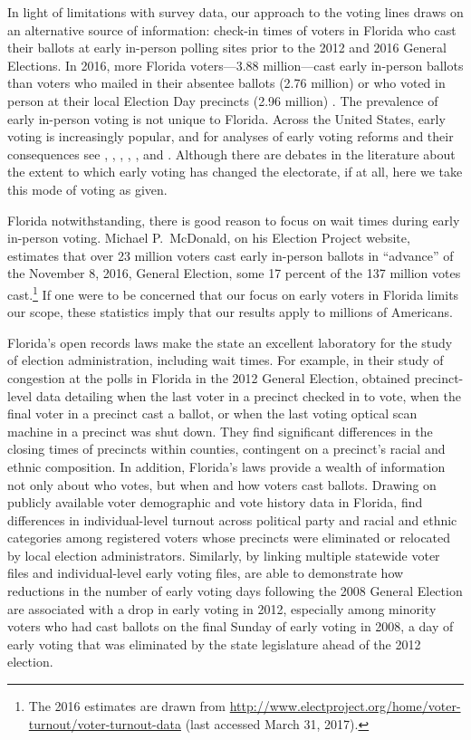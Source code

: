\documentclass[12pt,titlepage]{article}
\begin{document}
In light of limitations with survey data, our approach to the voting
lines draws on an alternative source of information: check-in times of
voters in Florida who cast their ballots at early in-person polling
sites prior to the 2012 and 2016 General Elections.  In 2016, more
Florida voters---3.88 million---cast early in-person ballots than
voters who mailed in their absentee ballots (2.76 million) or who
voted in person at their local Election Day precincts (2.96 million)
\citep{FDOS:2016vote}. The prevalence of early in-person voting is not
unique to Florida. Across the United States, early voting is
increasingly popular, and for analyses of early voting reforms and
their consequences see \citet{neelyrichardson:earlyvoting},
\citet{gronke:2012}, \citet{gronke:earlyvotingreforms},
\citet{gronketoffey:psychological}, \citet{gronkebaum:growth}, and
\citet{burdenetal:unanticipated}.  Although there are debates in the
literature about the extent to which early voting has changed the
electorate, if at all, here we take this mode of voting as
given. 

Florida notwithstanding, there is good reason to focus on wait times
during early in-person voting.  Michael P.\ McDonald, on his Election
Project website, estimates that over 23 million voters cast early
in-person ballots in ``advance'' of the November 8, 2016, General
Election, some 17 percent of the 137 million votes cast.\footnote{The
  2016 estimates are drawn from
  \url{http://www.electproject.org/home/voter-turnout/voter-turnout-data}
  (last accessed March 31, 2017).}  If one were to be concerned that
our focus on early voters in Florida limits our scope, these
statistics imply that our results apply to millions of Americans.

Florida's open records laws make the state an excellent laboratory for
the study of election administration, including wait times. For
example, in their study of congestion at the polls in Florida in the
2012 General Election, \cite{herronsmith:closingtimes} obtained
precinct-level data detailing when the last voter in a precinct
checked in to vote, when the final voter in a precinct cast a ballot,
or when the last voting optical scan machine in a precinct was shut
down. They find significant differences in the closing times of
precincts within counties, contingent on a precinct's racial and
ethnic composition.  In addition, Florida's laws provide a wealth of
information not only about who votes, but when and how voters cast
ballots.  Drawing on publicly available voter demographic and vote
history data in Florida, \cite{amos_etal2017} find differences in
individual-level turnout across political party and racial and ethnic
categories among registered voters whose precincts were eliminated or
relocated by local election administrators.  Similarly, by linking
multiple statewide voter files and individual-level early voting
files, \cite{herron_smith2014} are able to demonstrate how reductions
in the number of early voting days following the 2008 General Election
are associated with a drop in early voting in 2012, especially among
minority voters who had cast ballots on the final Sunday of early
voting in 2008, a day of early voting that was eliminated by the state
legislature ahead of the 2012 election.
\end{document}
